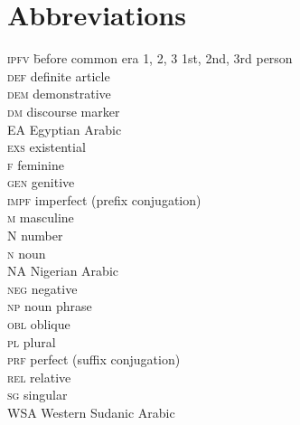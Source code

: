\documentclass[output=paper]{langsci/langscibook}
\begin{document}
\section*{Abbreviations}
\setlength{\columnsep}{30pt}
\begin{multicols}{2}
\begin{tabbing}
\textsc{ipfv} \hspace{1em} \= before common era\kill
\textsc{1, 2, 3} \> 1st, 2nd, 3rd person \\
\textsc{def} \> {definite} {article} \\
\textsc{dem} \> demonstrative \\
\textsc{dm} \> discourse marker \\
{EA} \> {Egyptian} {Arabic} \\
\textsc{exs} \> {existential}  \\
\textsc{f} \> feminine \\
\textsc{gen} \> genitive \\
\textsc{impf} \> imperfect (prefix conjugation) \\
\textsc{m} \> masculine \\
N \> number \\
\textsc{n} \> noun \\
{NA} \> {{Nigerian} Arabic} \\
\textsc{neg} \> negative \\
\textsc{np} \> {noun phrase} \\
\textsc{obl} \> oblique \\
\textsc{pl} \> plural \\
\textsc{prf} \> perfect (suffix conjugation) \\
\textsc{rel} \> {relative} \\
\textsc{sg} \> singular \\
{WSA} \> Western {Sudanic} {Arabic}
\end{tabbing}
\end{multicols}


\sloppy
\printbibliography[heading=subbibliography,notkeyword=this]
\end{document}

